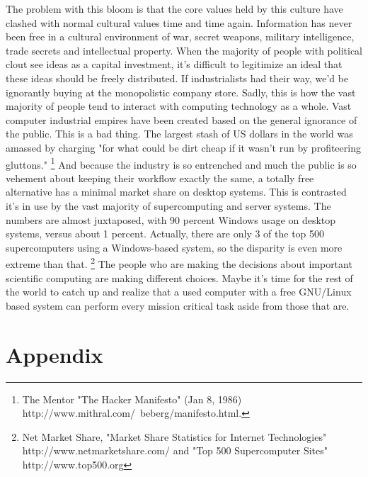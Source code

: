 \documentclass[11pt]{article}
\begin{document}
The problem with this bloom is that the core values held by this culture have clashed with normal cultural values time and time again. Information has never been free in a cultural environment of war, secret weapons, military intelligence, trade secrets and intellectual property. When the majority of people with political clout see ideas as a capital investment, it's difficult to legitimize an ideal that these ideas should be freely distributed. If industrialists had their way, we'd be ignorantly buying at the monopolistic company store. Sadly, this is how the vast majority of people tend to interact with computing technology as a whole. Vast computer industrial empires have been created based on the general ignorance of the public. This is a bad thing. The largest stash of US dollars in the world was amassed by charging "for what could be dirt cheap if it wasn't run by profiteering gluttons."
\footnote{The Mentor "The Hacker Manifesto" (Jan 8, 1986) http://www.mithral.com/~beberg/manifesto.html.}
And because the industry is so entrenched and much the public is so vehement about keeping their workflow exactly the same, a totally free alternative has a minimal market share on desktop systems. This is contrasted it's in use by the vast majority of supercomputing and server systems. The numbers are almost juxtaposed, with 90 percent Windows usage on desktop systems, versus about 1 percent. Actually, there are only 3 of the top 500 supercomputers using a Windows-based system, so the disparity is even more extreme than that.
\footnote{Net Market Share, "Market Share Statistics for Internet Technologies" http://www.netmarketshare.com/ and "Top 500 Supercomputer Sites" http://www.top500.org}
The people who are making the decisions about important scientific computing are making different choices. Maybe it's time for the rest of the world to catch up and realize that a used computer with a free GNU/Linux based system can perform every mission critical task aside from those that are.

\newpage
\section{Appendix}
\end{document}
